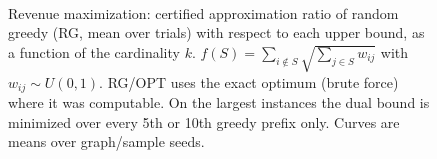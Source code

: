 \begin{figure}[t]
\centering
\setlength{\rgplotwidth}{0.245\textwidth}
\\[1pt]
\hfill
\hfill
\hfill

\caption{Revenue maximization: certified approximation ratio of random greedy (RG, mean over trials) with respect to each upper bound, as a function of the cardinality $k$. $f(S)=\sum_{i\notin S}\sqrt{\sum_{j\in S} w_{ij}}$ with $w_{ij}\sim U(0,1)$. RG/OPT uses the exact optimum (brute force) where it was computable. On the largest instances the dual bound is minimized over every 5th or 10th greedy prefix only. Curves are means over graph/sample seeds.}
\label{fig:rg-revenue_max-wide}
\end{figure}
